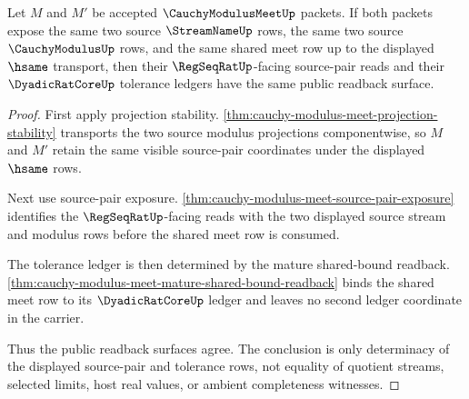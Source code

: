 \begin{theorem}
\label{thm:cauchy-modulus-meet-meet-projection-pair-determinacy}
Let $M$ and $M'$ be accepted $\CauchyModulusMeetUp$ packets. If both packets expose the same two source $\StreamNameUp$ rows, the same two source $\CauchyModulusUp$ rows, and the same shared meet row up to the displayed $\hsame$ transport, then their $\RegSeqRatUp$-facing source-pair reads and their $\DyadicRatCoreUp$ tolerance ledgers have the same public readback surface.
\end{theorem}
\begin{proof}
First apply projection stability. \autoref{thm:cauchy-modulus-meet-projection-stability} transports the two source modulus projections componentwise, so $M$ and $M'$ retain the same visible source-pair coordinates under the displayed $\hsame$ rows.

Next use source-pair exposure. \autoref{thm:cauchy-modulus-meet-source-pair-exposure} identifies the $\RegSeqRatUp$-facing reads with the two displayed source stream and modulus rows before the shared meet row is consumed.

The tolerance ledger is then determined by the mature shared-bound readback. \autoref{thm:cauchy-modulus-meet-mature-shared-bound-readback} binds the shared meet row to its $\DyadicRatCoreUp$ ledger and leaves no second ledger coordinate in the carrier.

Thus the public readback surfaces agree. The conclusion is only determinacy of the displayed source-pair and tolerance rows, not equality of quotient streams, selected limits, host real values, or ambient completeness witnesses.
\end{proof}

